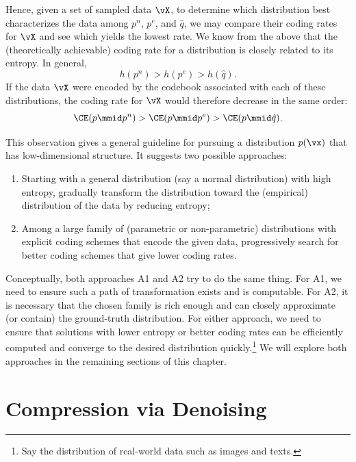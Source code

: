 \documentclass[../../book-main.tex]{subfiles}
\begin{document}
Hence, given a set of sampled data \(\vX\), to determine which
distribution best characterizes the data among
\(p^{n}\), \(p^{e}\), and \(\hat{q}\), we may compare their coding
rates for \(\vX\) and see which yields the lowest rate. We know
from the above that the (theoretically achievable) coding rate for a
distribution is closely related to its entropy. In general,
\begin{equation}
    h(p^{n}) > h(p^{e}) > h(\hat{q}).
\end{equation}
If the data \(\vX\) were encoded by the codebook associated
with each of these distributions, the coding rate for \(\vX\) would
therefore decrease in the same order:
\begin{equation}
    \CE(p \mmid p^{n}) > \CE(p \mmid p^{e}) > \CE(p \mmid \hat{q}).
\end{equation}

This observation gives a general guideline for pursuing a
distribution \(p(\vx)\) that has low-dimensional structure. It
suggests two possible approaches:
\begin{enumerate}[label={A\arabic*.}, leftmargin=*]
    \item Starting with a general distribution (say a normal
        distribution) with high entropy, gradually transform the
        distribution toward the (empirical) distribution of the data
        by reducing entropy;
    \item Among a large family of (parametric or non-parametric)
        distributions with explicit coding schemes that encode the
        given data, progressively search for better coding schemes
        that give lower coding rates.
\end{enumerate}
Conceptually, both approaches A1 and A2 try to do the same thing.
For A1, we need to ensure such a path of transformation exists and is
computable. For A2, it is necessary that the chosen family is rich
enough and can closely approximate (or contain) the ground-truth
distribution. For either approach, we need to ensure that solutions
with lower entropy or better coding rates can be efficiently computed
and converge to the desired distribution quickly.\footnote{Say the
distribution of real-world data such as images and texts.} We will
explore both approaches in the remaining sections of this chapter.

\section{Compression via Denoising}\label{sub:compression_denoising}
\end{document}
